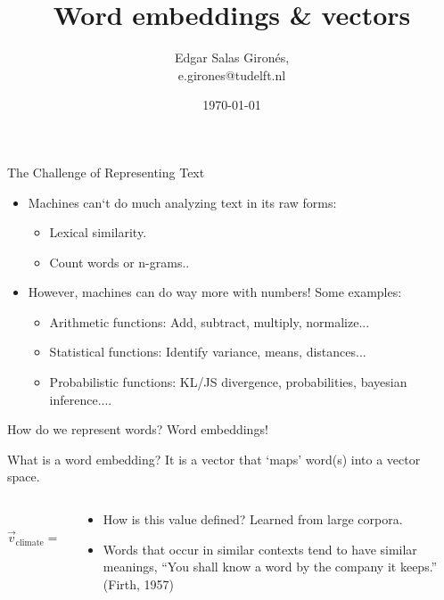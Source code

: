 \documentclass{beamer}
\title{Word embeddings \& vectors}
\author[E. Salas Gironés]{Edgar Salas Gironés, \\ e.girones@tudelft.nl}
\date{\today}
\begin{document}
\frame{\titlepage}

\begin{frame}{The Challenge of Representing Text}
    \begin{itemize}
        \item Machines can`t do much analyzing text in its raw forms:
        \begin{itemize}
            \item Lexical similarity.
            \item Count words or n-grams..
        \end{itemize} 
        \item However, machines can do way more with numbers! Some examples:
        \begin{itemize}
            \item Arithmetic functions: Add, subtract, multiply, normalize... 
            \item Statistical functions: Identify variance, means, distances...
            \item Probabilistic functions: KL/JS divergence, probabilities, bayesian inference....
        \end{itemize}
    \end{itemize}
\end{frame}

\begin{frame}{How do we represent words? Word embeddings!}

What is a word embedding? It is a vector that `maps' word(s) into a vector space.

    \begin{columns}
        \begin{column}{0.3\textwidth}
            \[
            \vec{v}_{\text{climate}} =
            \begin{bmatrix}
            0.12 \\
            -0.87 \\
            \vdots \\
            0.45
            \end{bmatrix}
            \]
        \end{column}

        \begin{column}{0.7\textwidth}
            \begin{itemize}
                \item How is this value defined? Learned from large corpora.
                \item Words that occur in similar contexts tend to have similar meanings, “You shall know a word by the company it keeps.” (Firth, 1957)
            \end{itemize}
        \end{column}
    \end{columns}

\end{frame}
\end{document}
